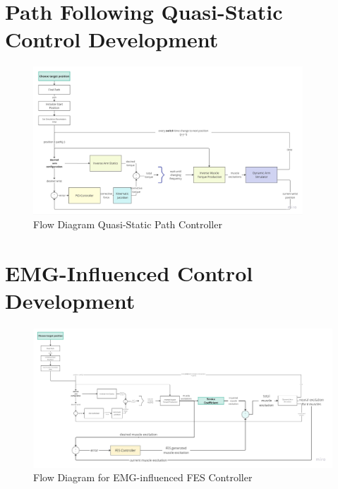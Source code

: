 
\section{Path Following Quasi-Static Control Development }
\begin{figure}[h!]
    \centering
    \includegraphics[width=0.9\textwidth]{Pictures/Controller/Quasi-Static Path Controller.jpg}
    \caption{Flow Diagram Quasi-Static Path Controller }
    \label{fig:PathController}
\end{figure}
\section{EMG-Influenced Control Development}

\newpage
\begin{landscape} %
  \begin{figure}[h!]
    \centering
    \includegraphics[width=1.7\textwidth]{Pictures/Controller/FESController.jpg} %
    \caption{Flow Diagram for EMG-influenced FES Controller} %
    \label{fig:FESController} %
  \end{figure}
\end{landscape} %

